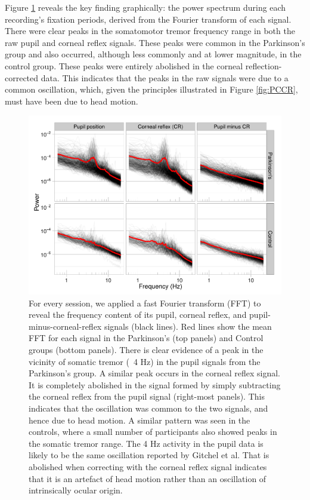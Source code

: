 \documentclass[jou,a4paper]{apa6}
\begin{document}
Figure \ref{fig:FFT} reveals the key finding graphically: the power spectrum during each recording's fixation periods, derived from the Fourier transform of each signal. There were clear peaks in the somatomotor tremor frequency range in both the raw pupil and corneal reflex signals. These peaks were common in the Parkinson's group and also occurred, although less commonly and at lower magnitude, in the control group. These peaks were entirely abolished in the corneal reflection-corrected data. This indicates that the peaks in the raw signals were due to a common oscillation, which, given the principles illustrated in Figure \ref{fig:PCCR}, must have been due to head motion.

\begin{figure}[htbp]
\begin{center}
\includegraphics {Figures/Figure_3_Individual_FFTs}
\caption{For every session, we applied a fast Fourier transform (FFT) to reveal the frequency content of its pupil, corneal reflex, and pupil-minus-corneal-reflex signals (black lines). Red lines show the mean FFT for each signal in the Parkinson's (top panels) and Control groups (bottom panels). There is clear evidence of a peak in the vicinity of somatic tremor (~4 Hz) in the pupil signals from the Parkinson's group. A similar peak occurs in the corneal reflex signal. It is completely abolished in the signal formed by simply subtracting the corneal reflex from the pupil signal (right-most panels). This indicates that the oscillation was common to the two signals, and hence due to head motion. A similar pattern was seen in the controls, where a small number of participants also showed peaks in the somatic tremor range. The 4 Hz activity in the pupil data is likely to be the same oscillation reported by Gitchel et al. That is abolished when correcting with the corneal reflex signal indicates that it is an artefact of head motion rather than an oscillation of intrinsically ocular origin.}
\label{fig:FFT}
\end{center}
\end{figure}
\end{document}
